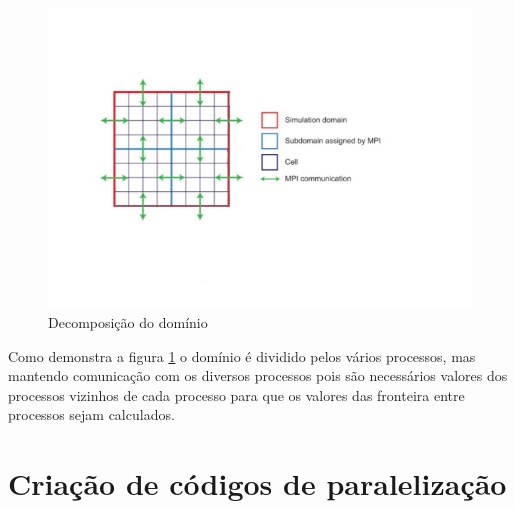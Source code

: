\documentclass[10pt]{extarticle}
\begin{document}
  \begin{figure}[H]
  \centering
  \includegraphics[width=\linewidth]{domain_decomposion_2.png}
  \caption{Decomposição do domínio}
  \label{fig:subDomains}
  \end{figure}

Como demonstra a figura \ref{fig:subDomains} o domínio é dividido pelos vários processos, mas mantendo comunicação com os diversos processos pois são necessários valores dos processos vizinhos de cada processo para que os valores das fronteira entre processos sejam calculados.








\section{Criação de códigos de paralelização}
\end{document}
